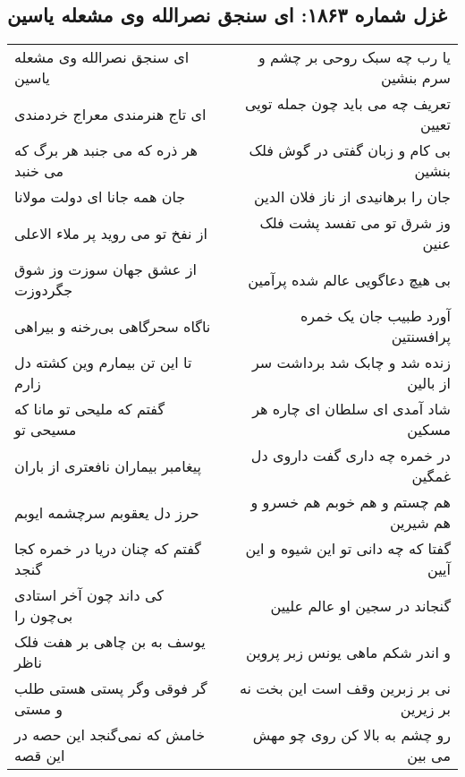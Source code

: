 \begin{center}
\section*{غزل شماره ۱۸۶۳: ای سنجق نصرالله وی مشعله یاسین}
\label{sec:1863}
\begin{longtable}{l p{0.5cm} r}
ای سنجق نصرالله وی مشعله یاسین
&&
یا رب چه سبک روحی بر چشم و سرم بنشین
\\
ای تاج هنرمندی معراج خردمندی
&&
تعریف چه می باید چون جمله تویی تعیین
\\
هر ذره که می جنبد هر برگ که می خنبد
&&
بی کام و زبان گفتی در گوش فلک بنشین
\\
جان همه جانا ای دولت مولانا
&&
جان را برهانیدی از ناز فلان الدین
\\
از نفخ تو می روید پر ملاء الاعلی
&&
وز شرق تو می تفسد پشت فلک عنین
\\
از عشق جهان سوزت وز شوق جگردوزت
&&
بی هیچ دعاگویی عالم شده پرآمین
\\
ناگاه سحرگاهی بی‌رخنه و بیراهی
&&
آورد طبیب جان یک خمره پرافسنتین
\\
تا این تن بیمارم وین کشته دل زارم
&&
زنده شد و چابک شد برداشت سر از بالین
\\
گفتم که ملیحی تو مانا که مسیحی تو
&&
شاد آمدی ای سلطان ای چاره هر مسکین
\\
پیغامبر بیماران نافعتری از باران
&&
در خمره چه داری گفت داروی دل غمگین
\\
حرز دل یعقوبم سرچشمه ایوبم
&&
هم چستم و هم خوبم هم خسرو و هم شیرین
\\
گفتم که چنان دریا در خمره کجا گنجد
&&
گفتا که چه دانی تو این شیوه و این آیین
\\
کی داند چون آخر استادی بی‌چون را
&&
گنجاند در سجین او عالم علیین
\\
یوسف به بن چاهی بر هفت فلک ناظر
&&
و اندر شکم ماهی یونس زبر پروین
\\
گر فوقی وگر پستی هستی طلب و مستی
&&
نی بر زبرین وقف است این بخت نه بر زیرین
\\
خامش که نمی‌گنجد این حصه در این قصه
&&
رو چشم به بالا کن روی چو مهش می بین
\\
\end{longtable}
\end{center}
